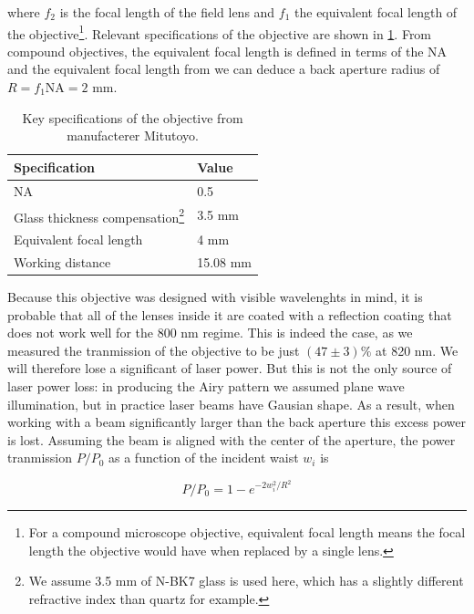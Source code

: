where $f_2$ is the focal length of the field lens and $f_1$ the equivalent focal length of the objective\footnote{For a compound microscope objective, equivalent focal length means the focal length the objective would have when replaced by a single lens.}. Relevant specifications of the objective are shown in \cref{table:MitutoyoSpecs}. 
From compound objectives, the equivalent focal length is defined in terms of the \ac{NA} and the equivalent focal length from we can deduce a back aperture radius of $R = f_1 \text{NA} = 2$ mm. 

\begin{table}[h]
    \centering
    \caption{Key specifications of the objective from manufacterer Mitutoyo.}
    \label{table:MitutoyoSpecs}
    \begin{tabular}{l | l}
        \textbf{Specification}       & \textbf{Value} \\ \hline 
        NA                           & 0.5            \\ \hline
        Glass thickness compensation\footnote{We assume 3.5 mm of N-BK7 glass is used here, which has a slightly different refractive index than quartz for example.} & 3.5 mm         \\ \hline
        Equivalent focal length      & 4 mm           \\ \hline
        Working distance             & 15.08 mm      
    \end{tabular}
\end{table}

Because this objective was designed with visible wavelenghts in mind, it is probable that all of the lenses inside it are coated with a reflection coating that does not work well for the 800 nm regime. 
This is indeed the case, as we measured the tranmission of the objective to be just $(47 \pm 3)\%$ at 820 nm. We will therefore lose a significant of laser power. 
But this is not the only source of laser power loss: in producing the Airy pattern we assumed plane wave illumination, but in practice laser beams have Gausian shape. 
As a result, when working with a beam significantly larger than the back aperture this excess power is lost. 
Assuming the beam is aligned with the center of the aperture, the power tranmission $P/P_0$ as a function of the incident waist $w_i$ is

\begin{equation}\label{eq:FracPowerCircular}
    P/P_0 = 1 - e^{-2w_i^2/R^2}
\end{equation}

